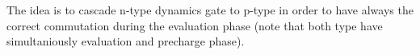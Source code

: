 The idea is to cascade n-type dynamics gate to p-type in order to have always the correct commutation during the evaluation phase (note that both type have simultaniously evaluation and precharge phase).\\




























































































































































